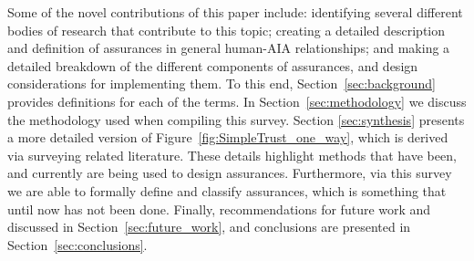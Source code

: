 Some of the novel contributions of this paper include: identifying several different bodies of research that contribute to this topic; creating a detailed description and definition of assurances in general human-AIA relationships; and making a detailed breakdown of the different components of assurances, and design considerations for implementing them. To this end, Section~\ref{sec:background} provides definitions for each of the terms. In Section~\ref{sec:methodology} we discuss the methodology used when compiling this survey. Section \ref{sec:synthesis} presents a more detailed version of Figure~\ref{fig:SimpleTrust_one_way}, which is derived via surveying related literature. These details highlight methods that have been, and currently are being used to design assurances. Furthermore, via this survey we are able to formally define and classify assurances, which is something that until now has not been done. Finally, recommendations for future work and discussed in Section~\ref{sec:future_work}, and conclusions are presented in Section~\ref{sec:conclusions}.
